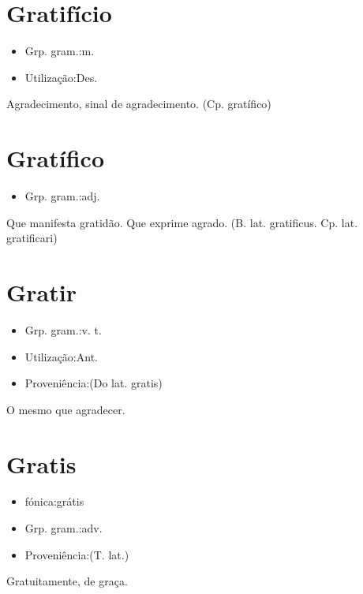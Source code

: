 \section{Gratifício}
\begin{itemize}
\item {Grp. gram.:m.}
\end{itemize}
\begin{itemize}
\item {Utilização:Des.}
\end{itemize}
Agradecimento, sinal de agradecimento.
(Cp. \textunderscore gratífico\textunderscore )
\section{Gratífico}
\begin{itemize}
\item {Grp. gram.:adj.}
\end{itemize}
Que manifesta gratidão.
Que exprime agrado.
(B. lat. \textunderscore gratificus\textunderscore . Cp. lat. \textunderscore gratificari\textunderscore )
\section{Gratir}
\begin{itemize}
\item {Grp. gram.:v. t.}
\end{itemize}
\begin{itemize}
\item {Utilização:Ant.}
\end{itemize}
\begin{itemize}
\item {Proveniência:(Do lat. \textunderscore gratis\textunderscore )}
\end{itemize}
O mesmo que \textunderscore agradecer\textunderscore .
\section{Gratis}
\begin{itemize}
\item {fónica:grátis}
\end{itemize}
\begin{itemize}
\item {Grp. gram.:adv.}
\end{itemize}
\begin{itemize}
\item {Proveniência:(T. lat.)}
\end{itemize}
Gratuitamente, de graça.

